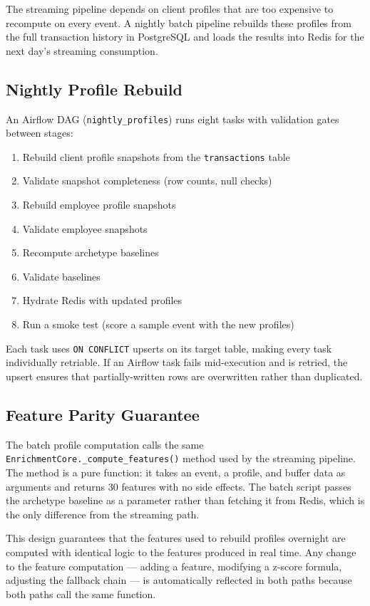 The streaming pipeline depends on client profiles that are too expensive to
recompute on every event. A nightly batch pipeline rebuilds these profiles
from the full transaction history in PostgreSQL and loads the results into
Redis for the next day's streaming consumption.

\subsection{Nightly Profile Rebuild}

An Airflow DAG (\texttt{nightly\_profiles}) runs eight tasks with validation
gates between stages:

\begin{enumerate}
    \item Rebuild client profile snapshots from the \texttt{transactions} table
    \item Validate snapshot completeness (row counts, null checks)
    \item Rebuild employee profile snapshots
    \item Validate employee snapshots
    \item Recompute archetype baselines
    \item Validate baselines
    \item Hydrate Redis with updated profiles
    \item Run a smoke test (score a sample event with the new profiles)
\end{enumerate}

Each task uses \texttt{ON CONFLICT} upserts on its target table, making every
task individually retriable. If an Airflow task fails mid-execution and is
retried, the upsert ensures that partially-written rows are overwritten
rather than duplicated.

\subsection{Feature Parity Guarantee}

The batch profile computation calls the same
\texttt{EnrichmentCore.\_compute\_features()} method used by the streaming
pipeline. The method is a pure function: it takes an event, a profile, and
buffer data as arguments and returns 30 features with no side effects. The
batch script passes the archetype baseline as a parameter rather than
fetching it from Redis, which is the only difference from the streaming path.

This design guarantees that the features used to rebuild profiles overnight are
computed with identical logic to the features produced in real time. Any change
to the feature computation --- adding a feature, modifying a z-score formula,
adjusting the fallback chain --- is automatically reflected in both paths
because both paths call the same function.

